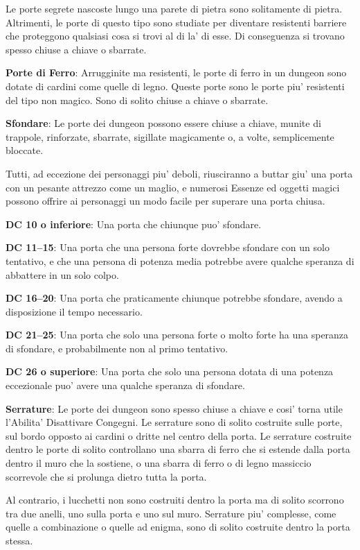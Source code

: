 \documentclass[a4paper,11pt,twoside,openany]{dndbook}
\begin{document}
Le porte segrete nascoste lungo una parete di pietra sono solitamente di pietra. Altrimenti, le porte di questo tipo sono studiate per diventare resistenti barriere che proteggono qualsiasi cosa si trovi al di la' di esse. Di conseguenza si trovano spesso chiuse a chiave o sbarrate.

\textbf{Porte di Ferro}: Arrugginite ma resistenti, le porte di ferro in un dungeon sono dotate di cardini come quelle di legno. Queste porte sono le porte piu' resistenti del tipo non magico. Sono di solito chiuse a chiave o sbarrate.

\textbf{Sfondare}: Le porte dei dungeon possono essere chiuse a chiave, munite di trappole, rinforzate, sbarrate, sigillate magicamente o, a volte, semplicemente bloccate.

Tutti, ad eccezione dei personaggi piu' deboli, riusciranno a buttar giu' una porta con un pesante attrezzo come un maglio, e numerosi Essenze ed oggetti magici possono offrire ai personaggi un modo facile per superare una porta chiusa.

\textbf{DC 10 o inferiore}: Una porta che chiunque puo' sfondare.

\textbf{DC 11--15}: Una porta che una persona forte dovrebbe sfondare con un solo tentativo, e che una persona di potenza media potrebbe avere qualche speranza di abbattere in un solo colpo.

\textbf{DC 16--20}: Una porta che praticamente chiunque potrebbe sfondare, avendo a disposizione il tempo necessario. 

\textbf{DC 21--25}: Una porta che solo una persona forte o molto forte ha una speranza di sfondare, e probabilmente non al primo tentativo. 

\textbf{DC 26 o superiore}: Una porta che solo una persona dotata di una potenza eccezionale puo' avere una qualche speranza di sfondare.

\textbf{Serrature}: Le porte dei dungeon sono spesso chiuse a chiave e cosi' torna utile l'Abilita' Disattivare Congegni. Le serrature sono di solito costruite sulle porte, sul bordo opposto ai cardini o dritte nel centro della porta. Le serrature costruite dentro le porte di solito controllano una sbarra di ferro che si estende dalla porta dentro il muro che la sostiene, o una sbarra di ferro o di legno massiccio scorrevole che si prolunga dietro tutta la porta. 

Al contrario, i lucchetti non sono costruiti dentro la porta ma di solito scorrono tra due anelli, uno sulla porta e uno sul muro. Serrature piu' complesse, come quelle a combinazione o quelle ad enigma, sono di solito costruite dentro la porta stessa. 
\end{document}
